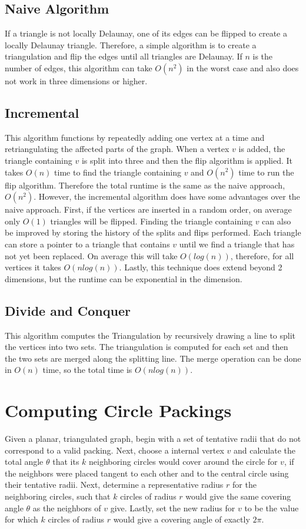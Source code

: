 \documentclass{article}
\begin{document}
\subsection{Naive Algorithm}
If a triangle is not locally Delaunay, one of its edges can be flipped to create a locally Delaunay triangle. Therefore, a simple algorithm is to create a triangulation and flip the edges until all triangles are Delaunay. If $n$ is the number of edges, this algorithm can take $O(n^2)$ in the worst case and also does not work in three dimensions or higher.
\subsection{Incremental}
This algorithm functions by repeatedly adding one vertex at a time and retriangulating the affected parts of the graph. When a vertex $v$ is added, the triangle containing $v$ is split into three and then the flip algorithm is applied. It takes $O(n)$ time to find the triangle containing $v$ and $O(n^2)$ time to run the flip algorithm. Therefore the total runtime is the same as the naive approach, $O(n^2)$. However, the incremental algorithm does have some advantages over the naive approach. First, if the vertices are inserted in a random order, on average only $O(1)$ triangles will be flipped. Finding the triangle containing $v$ can also be improved by storing the history of the splits and flips performed. Each triangle can store a pointer to a triangle that contains $v$ until we find a triangle that has not yet been replaced. On average this will take $O(log(n))$, therefore, for all vertices it takes $O(nlog(n))$. Lastly, this technique does extend beyond 2 dimensions, but the runtime can be exponential in the dimension. 
\subsection{Divide and Conquer}
This algorithm computes the Triangulation by recursively drawing a line to split the vertices into two sets. The triangulation is computed for each set and then the two sets are merged along the splitting line. The merge operation can be done in $O(n)$ time, so the total time is $O(nlog(n))$.

\section{Computing Circle Packings}
Given a planar, triangulated graph, begin with a set of tentative radii that do not correspond to a valid packing. Next, choose a internal vertex $v$ and calculate the total angle $\theta$ that its $k$ neighboring circles would cover around the circle for $v$, if the neighbors were placed tangent to each other and to the central circle using their tentative radii. Next, determine a representative radius $r$ for the neighboring circles, such that $k$ circles of radius $r$ would give the same covering angle $\theta$ as the neighbors of $v$ give. Lastly, set the new radius for $v$ to be the value for which $k$ circles of radius $r$ would give a covering angle of exactly $2\pi$.




\end{document}
